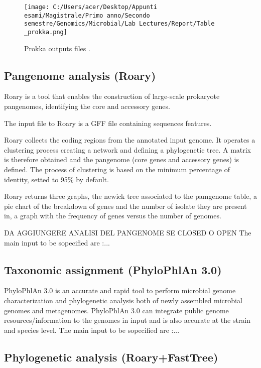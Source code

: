 \documentclass[a4paper,titlepage]{book}
\begin{document}
\begin{figure}[ht]
\centering
\texttt{[image: C:/Users/acer/Desktop/Appunti esami/Magistrale/Primo anno/Secondo semestre/Genomics/Microbial/Lab Lectures/Report/Table\\\_prokka.png]}
\caption{Prokka outputs files \cite{Prokka}.}
\label{fig:prokka-output}
\end{figure}

\subsection{Pangenome analysis (Roary)}

Roary is a tool that enables the construction of large-scale prokaryote pangenomes, identifying the core and accessory genes.

The input file to Roary is a GFF file containing sequences features. 

Roary collects the coding regions from the annotated input genome. It operates a clustering process creating a network and defining a phylogenetic tree. A matrix is therefore obtained and the pangenome (core genes and accessory genes) is defined.  The process of clustering is based on the minimum percentage of identity, setted to 95\% by default. \cite{Roary}

Roary returns three graphs, the newick tree associated to the pamgenome table, a pie chart of the breakdown of genes and the number of isolate they are present in, a graph with the frequency of genes versus the number of genomes. \cite{Roary-outputs}

DA AGGIUNGERE ANALISI DEL PANGENOME SE CLOSED O OPEN
The main input to be sopecified are :...

\subsection{Taxonomic assignment (PhyloPhlAn 3.0)}

PhyloPhlAn 3.0 is an accurate and rapid tool to perform microbial genome characterization and phylogenetic analysis both of newly assembled microbial genomes and metagenomes. PhyloPhlAn 3.0 can integrate public genome resources/information to the genomes in input and is also accurate at the strain and species level. \cite{Phylo}
The main input to be sopecified are :...

\subsection{Phylogenetic analysis (Roary+FastTree)}
\end{document}
